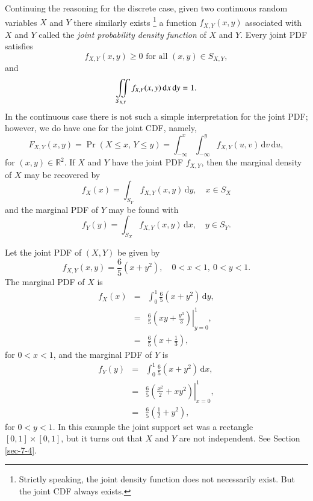 \documentclass[captions=tableheading]{scrbook}
\begin{document}
Continuing the reasoning for the discrete case, given two continuous random variables \(X\) and \(Y\) there similarly exists
\footnote{Strictly speaking, the joint density function does not necessarily exist. But the joint CDF always exists.}
a function \(f_{X,Y}(x,y)\) associated with \(X\) and \(Y\) called the \emph{joint probability density function} of \(X\) and \(Y\). Every joint PDF satisfies
\begin{equation}
f_{X,Y}(x,y)\geq0\mbox{ for all }(x,y)\in S_{X,Y},
\end{equation}
and
\begin{equation}
\iintop_{S_{X,Y}}f_{X,Y}(x,y)\,\mathrm{d} x\,\mathrm{d} y=1.
\end{equation}
In the continuous case there is not such a simple interpretation for the joint PDF; however, we do have one for the joint CDF, namely,
\[
F_{X,Y}(x,y)=\Pr(X\leq x,\, Y\leq y)=\int_{-\infty}^{x}\int_{-\infty}^{y}f_{X,Y}(u,v)\,\mathrm{d} v\,\mathrm{d} u,
\]
for \((x,y)\in\mathbb{R}^{2}\). If \(X\) and \(Y\) have the joint PDF \(f_{X,Y}\), then the marginal density of \(X\) may be recovered by
\begin{equation}
f_{X}(x)=\int_{S_{Y}}f_{X,Y}(x,y)\,\mathrm{d} y,\quad x \in S_{X}
\end{equation}
and the marginal PDF of \(Y\) may be found with
\begin{equation}
f_{Y}(y)=\int_{S_{X}}f_{X,Y}(x,y)\,\mathrm{d} x, \quad y \in S_{Y}.
\end{equation}


\begin{example}

Let the joint PDF of \((X,Y)\) be given by
\[
f_{X,Y}(x,y)=\frac{6}{5}\left(x+y^{2}\right),\quad0<x<1,\ 0<y<1.
\]
The marginal PDF of \(X\) is
\begin{eqnarray*}
f_{X}(x) & = & \int_{0}^{1}\frac{6}{5}\left(x+y^{2}\right)\,\mathrm{d} y,\\
 & = & \left.\frac{6}{5}\left(xy+\frac{y^{3}}{3}\right)\right|_{y=0}^{1},\\
 & = & \frac{6}{5}\left(x+\frac{1}{3}\right),
\end{eqnarray*}
for \(0<x<1\), and the marginal PDF of \(Y\) is
\begin{eqnarray*}
f_{Y}(y) & = & \int_{0}^{1}\frac{6}{5}\left(x+y^{2}\right)\,\mathrm{d} x,\\
 & = & \left.\frac{6}{5}\left(\frac{x^{2}}{2}+xy^{2}\right)\right|_{x=0}^{1},\\
 & = & \frac{6}{5}\left(\frac{1}{2}+y^{2}\right),
\end{eqnarray*}
for \(0<y<1\). In this example the joint support set was a rectangle \([0,1]\times[0,1]\), but it turns out that \(X\) and \(Y\) are not independent. See Section \ref{sec-7-4}.
\end{example}
\end{document}
